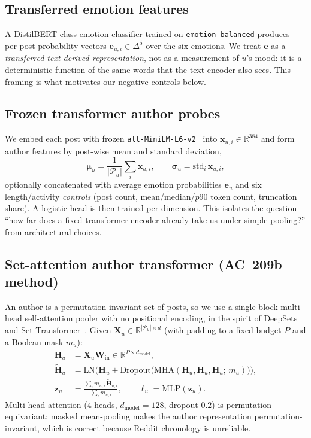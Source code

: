 \documentclass{article}
\begin{document}
\subsection{Transferred emotion features}
A DistilBERT-class emotion classifier trained on \texttt{emotion-balanced} produces per-post probability vectors $\mathbf{e}_{u,i}\in\Delta^{5}$ over the six emotions. We treat $\mathbf{e}$ as a \emph{transferred text-derived representation}, not as a measurement of $u$'s mood: it is a deterministic function of the same words that the text encoder also sees. This framing is what motivates our negative controls below.

\subsection{Frozen transformer author probes}
We embed each post with frozen \texttt{all-MiniLM-L6-v2}~\citep{wang2020minilm,reimers2019sentencebert} into $\mathbf{x}_{u,i}\in\mathbb{R}^{384}$ and form author features by post-wise mean and standard deviation,
\begin{equation}
  \boldsymbol{\mu}_u = \frac{1}{|\mathcal{P}_u|}\sum_{i} \mathbf{x}_{u,i},\qquad
  \boldsymbol{\sigma}_u = \mathrm{std}_{i}\,\mathbf{x}_{u,i},
\end{equation}
optionally concatenated with average emotion probabilities $\bar{\mathbf{e}}_u$ and six length/activity \emph{controls} (post count, mean/median/$p90$ token count, truncation share). A logistic head is then trained per dimension. This isolates the question ``how far does a fixed transformer encoder already take us under simple pooling?'' from architectural choices.

\subsection{Set-attention author transformer (AC~209b method)}
An author is a permutation-invariant set of posts, so we use a single-block multi-head self-attention pooler with no positional encoding, in the spirit of DeepSets~\citep{zaheer2017deepsets} and Set Transformer~\citep{lee2019settransformer}. Given $\mathbf{X}_u \in \mathbb{R}^{|\mathcal{P}_u|\times d}$ (with padding to a fixed budget $P$ and a Boolean mask $m_u$):
\begin{align}
  \mathbf{H}_u &= \mathbf{X}_u \mathbf{W}_{\text{in}} \in \mathbb{R}^{P\times d_{\text{model}}}, \\
  \widetilde{\mathbf{H}}_u &= \mathrm{LN}\!\Big(\mathbf{H}_u + \mathrm{Dropout}\big(\mathrm{MHA}(\mathbf{H}_u,\mathbf{H}_u,\mathbf{H}_u;\, m_u)\big)\Big), \\
  \mathbf{z}_u &= \frac{\sum_{i} m_{u,i}\,\widetilde{\mathbf{H}}_{u,i}}{\sum_i m_{u,i}}, \qquad
  \boldsymbol{\ell}_u = \mathrm{MLP}(\mathbf{z}_u).
\end{align}
Multi-head attention (4 heads, $d_{\text{model}}{=}128$, dropout $0.2$) is permutation-equivariant; masked mean-pooling makes the author representation permutation-invariant, which is correct because Reddit chronology is unreliable.
\end{document}
